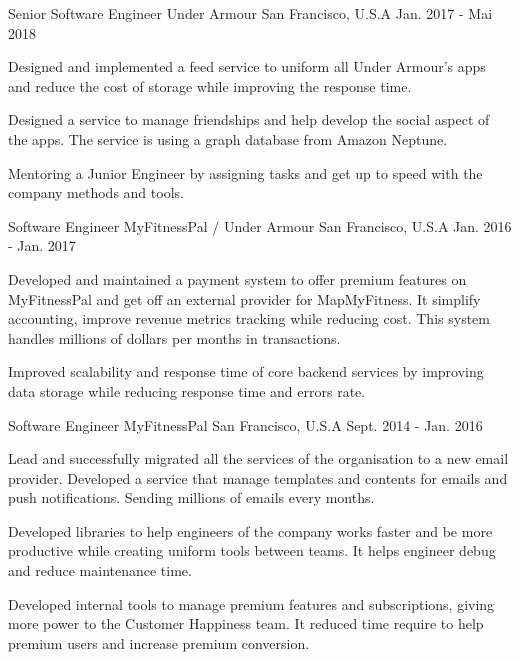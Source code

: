 \begin{cventries}
  \cventry
    {Senior Software Engineer}
    {Under Armour}
    {San Francisco, U.S.A}
    {Jan. 2017 - Mai 2018}
    {
      \begin{cvitems}
        \item {Designed and implemented a feed service to uniform all Under Armour's  apps and reduce the cost of storage while improving the response time.}
        \item {Designed a service to manage friendships and help develop the social aspect of the apps. The service is using a graph database from Amazon Neptune. }
         \item {Mentoring a Junior Engineer by assigning tasks and get up to speed with the company methods and tools.}
      \end{cvitems}
    }

  \cventry
    {Software Engineer}
    {MyFitnessPal / Under Armour}
    {San Francisco, U.S.A}
    {Jan. 2016 - Jan. 2017}
    {
      \begin{cvitems}
        \item{Developed and maintained a payment system to offer premium features on MyFitnessPal and get off an external provider for MapMyFitness. It simplify accounting, improve revenue metrics tracking while reducing cost. This system handles millions of dollars per months in transactions. }
	\item{Improved scalability and response time of core backend services by improving data storage while reducing response time and errors rate.}
      \end{cvitems}
    }
    
  \cventry
    {Software Engineer}
    {MyFitnessPal}
    {San Francisco, U.S.A}
    {Sept. 2014 - Jan. 2016}
    {
      \begin{cvitems}
        \item {Lead and successfully migrated all the services of the organisation to a new email provider. Developed a service that manage templates and contents for emails and push notifications. Sending millions of emails every months.}
        \item {Developed libraries to help engineers of the company works faster and be more productive while creating uniform tools between teams. It helps engineer debug and reduce maintenance time.}
        \item{Developed internal tools to manage premium features and subscriptions, giving more power to the Customer Happiness team. It reduced time require to help premium users and increase premium conversion.}
      \end{cvitems}
    }



\end{cventries}
